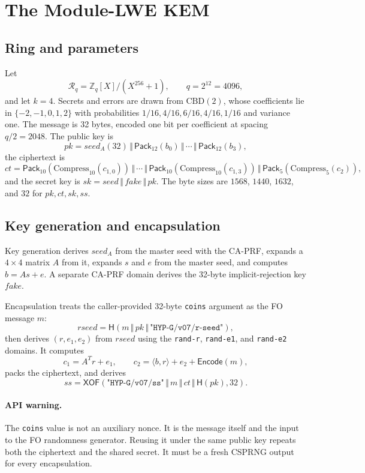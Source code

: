 \documentclass[11pt,a4paper]{article}
\theoremstyle{plain}
\theoremstyle{definition}
\theoremstyle{remark}
\newcommand{\concat}{\,\Vert\,}
\newcommand{\Z}{\mathbb{Z}}
\newcommand{\Ring}{\mathcal{R}_q}
\newcommand{\Hash}{\mathsf{H}}
\newcommand{\XOF}{\mathsf{XOF}}
\newcommand{\Encode}{\mathsf{Encode}}
\newcommand{\Pack}{\mathsf{Pack}}
\begin{document}
\section{The Module-LWE KEM}
\label{sec:kem}

\subsection{Ring and parameters}

Let
\[
  \Ring=\Z_q[X]/(X^{256}+1), \qquad q=2^{12}=4096,
\]
and let $k=4$.  Secrets and errors are drawn from $\mathrm{CBD}(2)$,
whose coefficients lie in $\{-2,-1,0,1,2\}$ with probabilities
$1/16,4/16,6/16,4/16,1/16$ and variance one.  The message is 32 bytes,
encoded one bit per coefficient at spacing $q/2=2048$.  The public key
is
\[
 pk=\mathit{seed}_A(32)\concat \Pack_{12}(b_0)\concat\cdots\concat
 \Pack_{12}(b_3),
\]
the ciphertext is
\[
 ct=\Pack_{10}(\mathrm{Compress}_{10}(c_{1,0}))\concat\cdots\concat
 \Pack_{10}(\mathrm{Compress}_{10}(c_{1,3}))
 \concat\Pack_5(\mathrm{Compress}_5(c_2)),
\]
and the secret key is $sk=\mathit{seed}\concat\mathit{fake}\concat pk$.
The byte sizes are $1568$, $1440$, $1632$, and $32$ for
$pk,ct,sk,ss$.

\subsection{Key generation and encapsulation}

Key generation derives $\mathit{seed}_A$ from the master seed with the
CA-PRF, expands a $4\times4$ matrix $A$ from it, expands $s$ and $e$
from the master seed, and computes $b=A s+e$.  A separate CA-PRF
domain derives the 32-byte implicit-rejection key $\mathit{fake}$.

Encapsulation treats the caller-provided 32-byte \texttt{coins}
argument as the FO message $m$:
\[
 \mathit{rseed}=\Hash(m\concat pk\concat\texttt{"HYP-G/v07/r-seed"}),
\]
then derives $(r,e_1,e_2)$ from $\mathit{rseed}$ using the
\texttt{rand-r}, \texttt{rand-e1}, and \texttt{rand-e2} domains.  It
computes
\[
 c_1=A^T r+e_1,\qquad
 c_2=\langle b,r\rangle+e_2+\Encode(m),
\]
packs the ciphertext, and derives
\[
 ss=\XOF(\texttt{"HYP-G/v07/ss"}\concat m\concat ct\concat
 \Hash(pk),32).
\]

\paragraph{API warning.}  The \texttt{coins} value is not an auxiliary
nonce.  It is the message itself and the input to the FO randomness
generator.  Reusing it under the same public key repeats both the
ciphertext and the shared secret.  It must be a fresh CSPRNG output for
every encapsulation.
\end{document}

